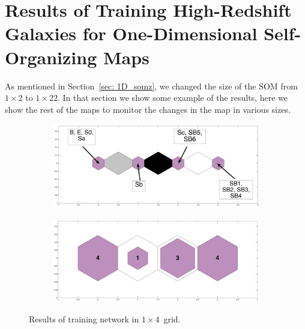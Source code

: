 \chapter[Self-Organizing Map for High-Redshift Galaxies]{Results of Training High-Redshift Galaxies for One-Dimensional Self-Organizing Maps}
\pagestyle{plain}
\label{app: high_Z_1d_soms}
\newpage
\myappendices

As mentioned in Section~\ref{sec: 1D_somz}, we changed the size of the SOM from $1\times2$ to $1\times22$. In that section we show some example of the results, here we show the rest of the maps to monitor the changes in the map in various sizes.

\label{app: 1d}
    \begin{figure}
        \begin{subfigure}[b]{0.5\textwidth}
            \centering
            \includegraphics[width=\textwidth]{../image_paper2/1d/apps/dist_1_by_4.png}
        \end{subfigure}
        \hfill
        \begin{subfigure}[b]{0.5\textwidth}
             \includegraphics[width=\textwidth]{../image_paper2/1d/apps/hit_t_1_by_4.png}
        \end{subfigure}
                \caption{Results of training network in $1\times4$~grid.}
         \label{fig: 1by4T}
    \end{figure}
    
